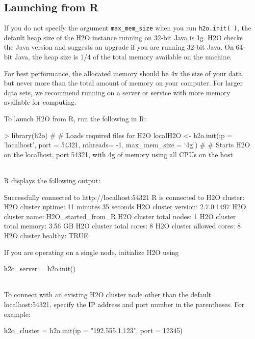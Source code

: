 \documentclass[11pt]{article}
\begin{document}
\subsection{Launching from R}

If you do not specify the argument {\texttt{max\_mem\_size}} when you run {\texttt{h2o.init( )}}, the default heap size of the H2O instance running on 32-bit Java is 1g. H2O checks the Java version and suggests an upgrade if you are running 32-bit Java. On 64-bit Java, the heap size is 1/4 of the total memory available on the machine. 

For best performance, the allocated memory should be 4x the size of your data, but never more than the total amount of memory on your computer. For larger data sets, we recommend running on a server or service with more memory available for computing.


To launch H2O from R, run the following in R:
\begin{spverbatim}
> library(h2o) # # Loads required files for H2O
localH2O <- h2o.init(ip = 'localhost', port = 54321, nthreads= -1, max_mem_size = ‘4g') # # Starts H2O on the localhost, port 54321, with 4g of memory using all CPUs on the host  \end{spverbatim} 
\\

R displays the following output: 
\begin{spverbatim}
Successfully connected to http://localhost:54321
       R is connected to H2O cluster:
   H2O cluster uptime:         11 minutes 35 seconds
   H2O cluster version:        2.7.0.1497
   H2O cluster name:           H2O_started_from_R
   H2O cluster total nodes:    1
   H2O cluster total memory:   3.56 GB
   H2O cluster total cores:    8
   H2O cluster allowed cores:  8
   H2O cluster healthy:        TRUE
\end{spverbatim}

If you are operating on a single node, initialize H2O using \begin{spverbatim} h2o_server = h2o.init()\end{spverbatim}\\

To connect with an existing H2O cluster node other than the default localhost:54321, specify the IP address and port number in the parentheses. For example: \begin{spverbatim}h2o_cluster = h2o.init(ip = "192.555.1.123", port = 12345)\end{spverbatim}
\end{document}
